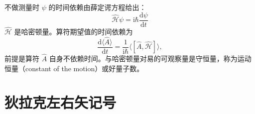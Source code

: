 不做测量时 $\psi$ 的时间依赖由薛定谔方程给出：
\begin{equation*}
\hat{\mathcal{H}}\psi = \mathrm{i}\hbar\frac{\mathrm{d}\psi}{\mathrm{d}t}\tag{C.6}
\end{equation*}
$\hat{\mathcal{H}}$ 是哈密顿量。算符期望值的时间依赖为
\begin{equation*}
\frac{\mathrm{d}\langle\hat{A}\rangle}{\mathrm{d}t} = \frac{1}{\mathrm{i}\hbar}\langle[\hat{A},\hat{\mathcal{H}}]\rangle,\tag{C.7}
\end{equation*}
前提是算符 $\hat{A}$ 自身不依赖时间。与哈密顿量对易的可观察量是守恒量，称为运动
恒量（constant of the motion）或好量子数。

\section{狄拉克左右矢记号}

